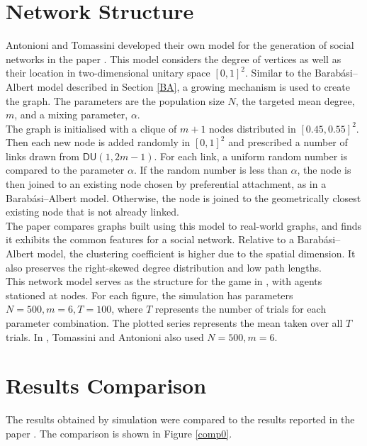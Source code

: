 \section{Network Structure}
Antonioni and Tomassini developed their own model for the generation of social networks in the paper \cite{RN51}. This model considers the degree of vertices as well as their location in two-dimensional unitary space $[0,1]^2$. Similar to the Barab\'{a}si--Albert model described in Section \ref{BA}, a growing mechanism is used to create the graph. The parameters are  the population size $N$, the targeted mean degree, $m$, and  a mixing parameter, $\alpha$. \\

The graph is initialised with a clique of $m+1$ nodes distributed in $[0.45, 0.55]^2$. Then each new node is added randomly in $[0,1]^2$ and prescribed a number of links drawn from $\mathsf{DU}(1,2m-1)$. For each link, a uniform random number is compared to the parameter $\alpha$. If the random number is less than $\alpha$, the node is then joined to an existing node chosen by preferential attachment, as in a Barab\'{a}si--Albert model. Otherwise, the node is joined to the geometrically closest existing node that is not already linked. \\

The paper \cite{RN51} compares graphs built using this model to real-world graphs, and finds it exhibits the common features for a social network. Relative to a Barab\'{a}si--Albert model, the clustering coefficient is higher due to the spatial dimension. It also preserves the right-skewed degree distribution and low path lengths. \\

This network model serves as the structure for the game in \cite{RN49}, with agents stationed at nodes. For each figure, the simulation has parameters $N=500, m = 6, T=100$, where $T$ represents the number of trials for each parameter combination. The plotted series represents the mean taken over all $T$ trials. In \cite{RN49}, Tomassini and Antonioni also used $N=500, m = 6$. 
\newpage

\section{Results Comparison}
The results obtained by simulation were compared to the results reported in the paper \cite{RN49}. The comparison is shown in Figure \ref{comp0}. \\

